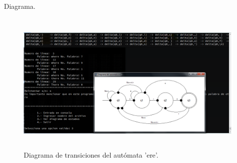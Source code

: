 	{\large Diagrama.}
	\begin{figure}[H]
		\begin{center}
			\includegraphics[width=\linewidth, height=7cm]{img/diagrama-ere.png}
			\caption{Diagrama de transiciones del autómata 'ere'.}
			\label{fig:ere3}
		\end{center}
	\end{figure}